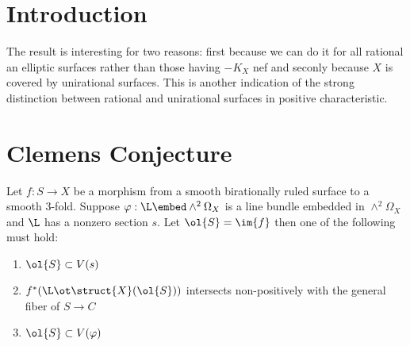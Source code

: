 \documentclass[12pt]{article}
\theoremstyle{plain}
\begin{document}
\section{Introduction}

The result is interesting for two reasons: first because we can do it for all rational an elliptic surfaces rather than those having $-K_X$ nef and seconly because $X$ is covered by unirational surfaces. This is another indication of the strong distinction between rational and unirational surfaces in positive characteristic. 

\section{Clemens Conjecture}

\begin{lemma}
Let $f : S \to X$ be a morphism from a smooth birationally ruled surface to a smooth 3-fold. Suppose $\varphi : \L \embed \wedge^2 \Omega_X$ is a line bundle embedded in $\wedge^2 \Omega_X$ and $\L$ has a nonzero section $s$. Let $\ol{S} = \im{f}$ then one of the following must hold:
\begin{enumerate}
\item $\ol{S} \subset V(s)$
\item $f^*(\L \ot \struct{X}(\ol{S}))$ intersects non-positively with the general fiber of $S \to C$
\item $\ol{S} \subset V(\varphi)$
\end{enumerate}
\end{lemma}
\end{document}
